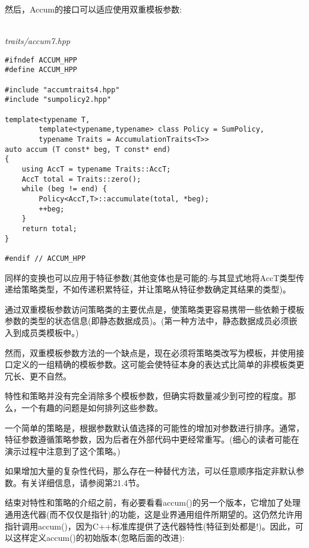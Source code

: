 然后，Accum的接口可以适应使用双重模板参数:

\hspace*{\fill} \\ %
\noindent
\textit{traits/accum7.hpp}
\begin{lstlisting}[style=styleCXX]
#ifndef ACCUM_HPP
#define ACCUM_HPP

#include "accumtraits4.hpp"
#include "sumpolicy2.hpp"

template<typename T,
		template<typename,typename> class Policy = SumPolicy,
		typename Traits = AccumulationTraits<T>>
auto accum (T const* beg, T const* end)
{
	using AccT = typename Traits::AccT;
	AccT total = Traits::zero();
	while (beg != end) {
		Policy<AccT,T>::accumulate(total, *beg);
		++beg;
	}
	return total;
}

#endif // ACCUM_HPP
\end{lstlisting}

同样的变换也可以应用于特征参数(其他变体也是可能的:与其显式地将AccT类型传递给策略类型，不如传递积累特征，并让策略从特征参数确定其结果的类型)。

通过双重模板参数访问策略类的主要优点是，使策略类更容易携带一些依赖于模板参数的类型的状态信息(即静态数据成员)。(第一种方法中，静态数据成员必须嵌入到成员类模板中。)

然而，双重模板参数方法的一个缺点是，现在必须将策略类改写为模板，并使用接口定义的一组精确的模板参数。这可能会使特征本身的表达式比简单的非模板类更冗长、更不自然。


特性和策略并没有完全消除多个模板参数，但确实将数量减少到可控的程度。那么，一个有趣的问题是如何排列这些参数。

一个简单的策略是，根据参数默认值选择的可能性的增加对参数进行排序。通常，特征参数遵循策略参数，因为后者在外部代码中更经常重写。(细心的读者可能在演示过程中注意到了这个策略。)

如果增加大量的复杂性代码，那么存在一种替代方法，可以任意顺序指定非默认参数。有关详细信息，请参阅第21.4节。


结束对特性和策略的介绍之前，有必要看看accum()的另一个版本，它增加了处理通用迭代器(而不仅仅是指针)的功能，这是业界通用组件所期望的。这仍然允许用指针调用accum()，因为C++标准库提供了迭代器特性(特征到处都是!)。因此，可以这样定义accum()的初始版本(忽略后面的改进):

